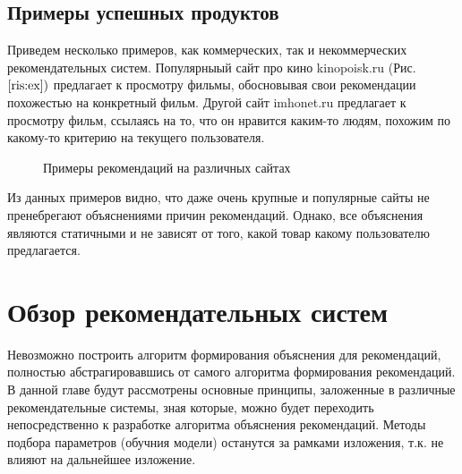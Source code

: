 \documentclass[12pt,a4paper]{report}
\begin{document}
\section{Примеры успешных продуктов}
Приведем несколько примеров, как коммерческих, так и некоммерческих рекомендательных систем.
Популярныый сайт про кино kinopoisk.ru (Рис. $\ref{ris:ex})$ предлагает к просмотру фильмы, обосновывая свои рекомендации похожестью на конкретный фильм.
Другой сайт imhonet.ru предлагает к просмотру фильм, ссылаясь на то, что он нравится каким-то людям, похожим по какому-то критерию на текущего пользователя.
\begin{figure}[H]
\begin{minipage}[h]{0.49\linewidth}
\end{minipage}
\hfill
\begin{minipage}[h]{0.49\linewidth}
\end{minipage}
\caption{Примеры рекомендаций на различных сайтах}
\label{ris:ex}
\end{figure}

Из данных примеров видно, что даже очень крупные и популярные сайты не пренебрегают объяснениями причин рекомендаций. Однако, все объяснения являются статичными и не зависят от того, какой товар какому пользователю предлагается.

\chapter{Обзор рекомендательных систем}
Невозможно построить алгоритм формирования объяснения для рекомендаций, полностью абстрагировавшись от самого алгоритма формирования рекомендаций. В данной главе будут рассмотрены основные принципы, заложенные в различные рекомендательные системы, зная которые, можно будет переходить непосредственно к разработке алгоритма объяснения рекомендаций.
Методы подбора параметров (обучния модели) останутся за рамками изложения, т.к. не влияют на дальнейшее изложение.
\end{document}
